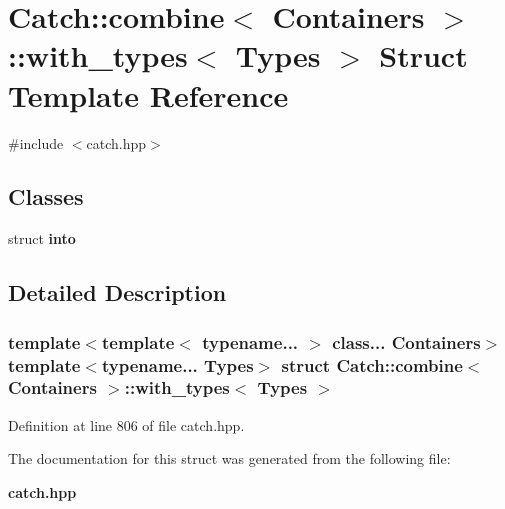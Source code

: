 \section{Catch\+::combine$<$ Containers $>$\+::with\+\_\+types$<$ Types $>$ Struct Template Reference}
\label{struct_catch_1_1combine_1_1with__types}


{\ttfamily \#include $<$catch.\+hpp$>$}

\subsection*{Classes}
\begin{DoxyCompactItemize}
\item 
struct \textbf{ into}
\end{DoxyCompactItemize}


\subsection{Detailed Description}
\subsubsection*{template$<$template$<$ typename... $>$ class... Containers$>$\newline
template$<$typename... Types$>$\newline
struct Catch\+::combine$<$ Containers $>$\+::with\+\_\+types$<$ Types $>$}



Definition at line 806 of file catch.\+hpp.



The documentation for this struct was generated from the following file\+:\begin{DoxyCompactItemize}
\item 
\textbf{ catch.\+hpp}\end{DoxyCompactItemize}
